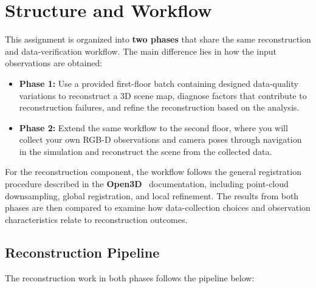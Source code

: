 \documentclass[11pt]{article}
\begin{document}
\section{Structure and Workflow}

This assignment is organized into \textbf{two phases} that share the same reconstruction
and data-verification workflow. The main difference lies in how the input
observations are obtained:

\begin{itemize}
    \item \textbf{Phase 1:} Use a provided first-floor batch containing designed data-quality variations to reconstruct a 3D scene map, diagnose factors that contribute to reconstruction failures, and refine the reconstruction based
on the analysis.

    \item \textbf{Phase 2:} Extend the same workflow to the second floor, where you will collect your own RGB-D observations and camera poses through navigation in the simulation and reconstruct the scene from the collected data.
\end{itemize}

For the reconstruction component, the workflow follows the general registration
procedure described in the \textbf{Open3D}~\cite{open3dglobal} documentation, including
point-cloud downsampling, global registration, and local refinement. The results
from both phases are then compared to examine how data-collection choices and
observation characteristics relate to reconstruction outcomes.


\subsection{Reconstruction Pipeline}

The reconstruction work in both phases follows the pipeline below:
\end{document}
